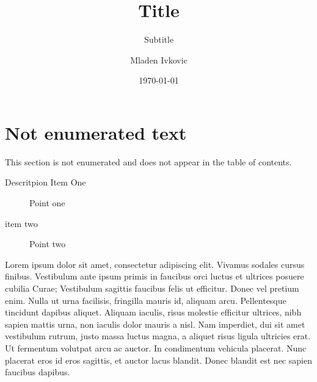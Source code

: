 




\title{Title}
\subtitle{Subtitle}
\author{Mladen Ivkovic}
\date{\today}







	
\nocite{*} %




	


\maketitle
\clearpage










\section*{Not enumerated text}
This section is not enumerated and does not appear in the table of contents.
\begin{description}
	\item[Descritpion Item One] Point one
	\item[item two] Point two
\end{description}


Lorem ipsum dolor sit amet, consectetur adipiscing elit. Vivamus sodales cursus finibus. Vestibulum ante ipsum primis in faucibus orci luctus et ultrices posuere cubilia Curae; Vestibulum sagittis faucibus felis ut efficitur. Donec vel pretium enim. Nulla ut urna facilisis, fringilla mauris id, aliquam arcu. Pellentesque tincidunt dapibus aliquet. Aliquam iaculis, risus molestie efficitur ultrices, nibh sapien mattis urna, non iaculis dolor mauris a nisl. Nam imperdiet, dui sit amet vestibulum rutrum, justo massa luctus magna, a aliquet risus ligula ultricies erat. Ut fermentum volutpat arcu ac auctor. In condimentum vehicula placerat. Nunc placerat eros id eros sagittis, et auctor lacus blandit. Donec blandit est nec sapien faucibus dapibus.

